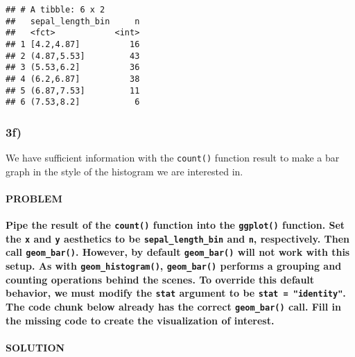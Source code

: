 \documentclass[]{article}
\newenvironment{Shaded}{\begin{snugshade}}{\end{snugshade}}
\newcommand{\CommentTok}[1]{\textcolor[rgb]{0.56,0.35,0.01}{\textit{#1}}}
\newcommand{\DataTypeTok}[1]{\textcolor[rgb]{0.13,0.29,0.53}{#1}}
\newcommand{\KeywordTok}[1]{\textcolor[rgb]{0.13,0.29,0.53}{\textbf{#1}}}
\newcommand{\NormalTok}[1]{#1}
\newcommand{\OperatorTok}[1]{\textcolor[rgb]{0.81,0.36,0.00}{\textbf{#1}}}
\newcommand{\StringTok}[1]{\textcolor[rgb]{0.31,0.60,0.02}{#1}}
\let\oldparagraph\paragraph
\renewcommand{\paragraph}[1]{\oldparagraph{#1}\mbox{}}
\begin{document}
\begin{verbatim}
## # A tibble: 6 x 2
##   sepal_length_bin     n
##   <fct>            <int>
## 1 [4.2,4.87]          16
## 2 (4.87,5.53]         43
## 3 (5.53,6.2]          36
## 4 (6.2,6.87]          38
## 5 (6.87,7.53]         11
## 6 (7.53,8.2]           6
\end{verbatim}

\hypertarget{f}{%
\subsubsection{3f)}\label{f}}

We have sufficient information with the \texttt{count()} function result
to make a bar graph in the style of the histogram we are interested in.

\hypertarget{problem-16}{%
\paragraph{PROBLEM}\label{problem-16}}

\textbf{Pipe the result of the \texttt{count()} function into the
\texttt{ggplot()} function. Set the \texttt{x} and \texttt{y} aesthetics
to be \texttt{sepal\_length\_bin} and \texttt{n}, respectively. Then
call \texttt{geom\_bar()}. However, by default \texttt{geom\_bar()} will
not work with this setup. As with \texttt{geom\_histogram()},
\texttt{geom\_bar()} performs a grouping and counting operations behind
the scenes. To override this default behavior, we must modify the
\texttt{stat} argument to be \texttt{stat\ =\ "identity"}. The code
chunk below already has the correct \texttt{geom\_bar()} call. Fill in
the missing code to create the visualization of interest.}

\hypertarget{solution-15}{%
\paragraph{SOLUTION}\label{solution-15}}

\begin{Shaded}
\end{Shaded}
\end{document}
